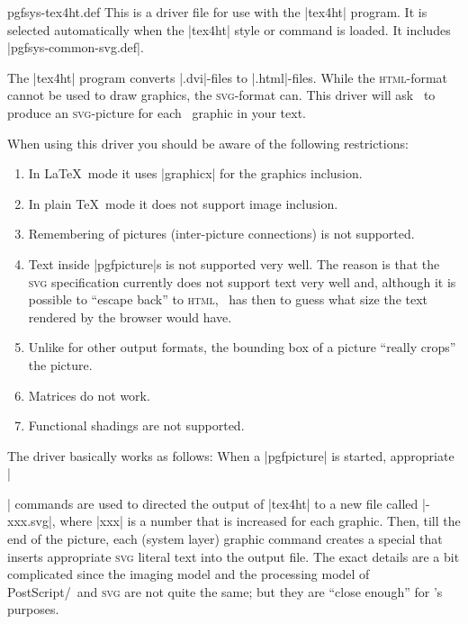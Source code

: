 \begin{filedescription}{pgfsys-tex4ht.def}
    This is a driver file for use with the |tex4ht| program. It is selected
    automatically when the |tex4ht| style or command is loaded. It includes
    |pgfsys-common-svg.def|.

    The |tex4ht| program converts |.dvi|-files to |.html|-files. While the
    \textsc{html}-format cannot be used to draw graphics, the
    \textsc{svg}-format can. This driver will ask \pgfname\ to produce an
    \textsc{svg}-picture for each \pgfname\ graphic in your text.

    When using this driver you should be aware of the following restrictions:
    \begin{enumerate}
        \item In \LaTeX\ mode it uses |graphicx| for the graphics inclusion.
        \item In plain \TeX\ mode it does not support image inclusion.
        \item Remembering of pictures (inter-picture connections) is not
            supported.
        \item Text inside |pgfpicture|s is not supported very well. The
            reason is that the \textsc{svg} specification currently does not
            support text very well and, although it is possible to ``escape
            back'' to \textsc{html}, \tikzname\ has then to guess what size
            the text rendered by the browser would have.
        \item Unlike for other output formats, the bounding box of a picture
            ``really crops'' the picture.
        \item Matrices do not work.
        \item Functional shadings are not supported.
    \end{enumerate}

    The driver basically works as follows: When a |{pgfpicture}| is started,
    appropriate |\special| commands are used to directed the output of |tex4ht|
    to a new file called |\jobname-xxx.svg|, where |xxx| is a number that is
    increased for each graphic. Then, till the end of the picture, each (system
    layer) graphic command creates a special that inserts appropriate
    \textsc{svg} literal text into the output file. The exact details are a bit
    complicated since the imaging model and the processing model of
    PostScript/\pdf\ and \textsc{svg} are not quite the same; but they are
    ``close enough'' for \pgfname's purposes.


\end{filedescription}
